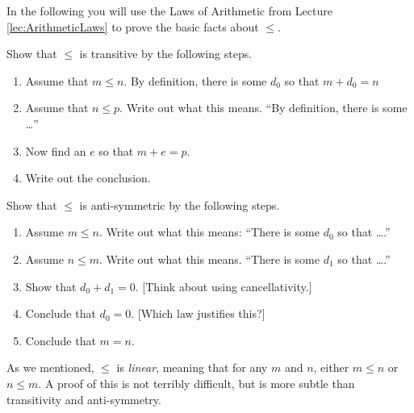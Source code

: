 \begin{exer}
	In the following you will use the Laws of Arithmetic from Lecture \ref{lec:ArithmeticLaws} to prove the basic facts about $\leq$.
	\begin{exercise} 
    \item Show that $\leq$ is transitive by the following steps.
    \begin{enumerate}
    \item Assume that $m\leq n$. By definition, there is some $d_0$ so
      that $m+d_0 = n$
    \item Assume that $n\leq p$. Write out what this means. ``By
      definition, there is some \ldots''
    \item Now find an $e$ so that $m+e = p$.
    \item Write out the conclusion.
    \end{enumerate}

    \item Show that $\leq$ is anti-symmetric by the following steps.
    \begin{enumerate}
    \item Assume $m\leq n$. Write out what this means: ``There is some
      $d_0$ so that \ldots.''
    \item Assume $n\leq m$. Write out what this means. ``There is some
      $d_1$ so that \ldots.''
    \item Show that $d_0 + d_1 = 0$. [Think about using
      cancellativity.]
    \item Conclude that $d_0 = 0$. [Which law justifies this?]
    \item Conclude that $m = n$.
    \end{enumerate}
	\end{exercise}
\end{exer}

As we mentioned, $\leq$ is \emph{linear}, meaning
that for any $m$ and $n$, either $m\leq n$ or $n\leq m$. A proof of
this is not terribly difficult, but is more subtle than transitivity and anti-symmetry.

